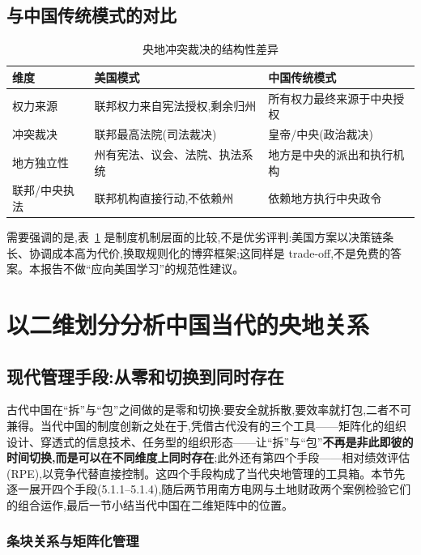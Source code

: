 \documentclass[UTF8,12pt,a4paper]{ctexrep}
\begin{document}
\section{与中国传统模式的对比}

\begin{table}[htbp]
  \centering
  \small
  \caption{央地冲突裁决的结构性差异}
  \label{tab:us-cn}
  \begin{tabularx}{\linewidth}{@{}lXX@{}}
    \toprule
    \textbf{维度} & \textbf{美国模式} & \textbf{中国传统模式} \\
    \midrule
    权力来源 & 联邦权力来自宪法授权,剩余归州 & 所有权力最终来源于中央授权 \\
    冲突裁决 & 联邦最高法院(司法裁决) & 皇帝/中央(政治裁决) \\
    地方独立性 & 州有宪法、议会、法院、执法系统 & 地方是中央的派出和执行机构 \\
    联邦/中央执法 & 联邦机构直接行动,不依赖州 & 依赖地方执行中央政令 \\
    \bottomrule
  \end{tabularx}
\end{table}

需要强调的是,表~\ref{tab:us-cn} 是制度机制层面的比较,不是优劣评判:美国方案以决策链条长、协调成本高为代价,换取规则化的博弈框架;这同样是 trade-off,不是免费的答案。本报告不做``应向美国学习''的规范性建议。

\chapter{以二维划分分析中国当代的央地关系}

\section{现代管理手段:从零和切换到同时存在}

古代中国在``拆''与``包''之间做的是零和切换:要安全就拆散,要效率就打包,二者不可兼得。当代中国的制度创新之处在于,凭借古代没有的三个工具——矩阵化的组织设计、穿透式的信息技术、任务型的组织形态——让``拆''与``包''\textbf{不再是非此即彼的时间切换,而是可以在不同维度上同时存在};此外还有第四个手段——相对绩效评估(RPE),以竞争代替直接控制。这四个手段构成了当代央地管理的工具箱。本节先逐一展开四个手段(5.1.1--5.1.4),随后两节用南方电网与土地财政两个案例检验它们的组合运作,最后一节小结当代中国在二维矩阵中的位置。

\subsection{条块关系与矩阵化管理}
\end{document}
